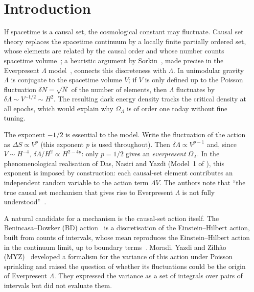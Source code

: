 \documentclass{iopjournal}
\begin{document}
\section{Introduction}
\label{sec:intro}

If spacetime is a causal set, the cosmological constant may fluctuate.
Causal set theory replaces the spacetime continuum by a locally finite
partially ordered set, whose elements are related by the causal order and
whose number counts spacetime volume~\cite{Bombelli1987,Surya2019}; a
heuristic argument by Sorkin~\cite{Sorkin1997,Sorkin2007b}, made precise in
the Everpresent $\Lambda$ model~\cite{Ahmed2004,Ahmed2013,Das2023,Das2024},
connects this discreteness with $\Lambda$. In unimodular gravity $\Lambda$ is conjugate to the
spacetime volume $V$; if $V$ is only defined up to the Poisson fluctuation
$\delta N=\sqrt{N}$ of the number of elements, then $\Lambda$ fluctuates by
$\delta\Lambda\sim V^{-1/2}\sim H^2$. The resulting dark energy density tracks
the critical density at all epochs, which would explain why $\Omega_\Lambda$
is of order one today without fine tuning.

The exponent $-1/2$ is essential to the model. Write the fluctuation of the
action as $\Delta S\propto V^p$ (this exponent $p$ is used throughout). Then
$\delta\Lambda\propto V^{p-1}$ and, since $V\sim H^{-4}$,
$\delta\Lambda/H^2\propto H^{2-4p}$: only $p=1/2$ gives an
\emph{everpresent} $\Omega_\Lambda$. In the
phenomenological realisation of Das, Nasiri and Yazdi (Model~1 of
\cite{Das2023}), this exponent is imposed by construction: each causal-set
element contributes an independent random variable to the action term
$\Lambda V$. The authors note that ``the true causal set mechanism that gives
rise to Everpresent $\Lambda$ is not fully understood''~\cite{Das2023}.

A natural candidate for a mechanism is the causal-set action itself. The
Benincasa--Dowker (BD) action~\cite{Benincasa2010,Dowker2013} is a
discretisation of the Einstein--Hilbert action, built from counts of
intervals, whose mean reproduces the Einstein--Hilbert action in the
continuum limit, up to boundary terms~\cite{Buck2015,Dowker2025}. Moradi, Yazdi and Zilh\~ao (MYZ)~\cite{Moradi2025} developed
a formalism for the variance of this action under Poisson sprinkling and
raised the question of whether its fluctuations could be the origin of
Everpresent $\Lambda$. They expressed the variance as a set of integrals over
pairs of intervals but did not evaluate them.
\end{document}
